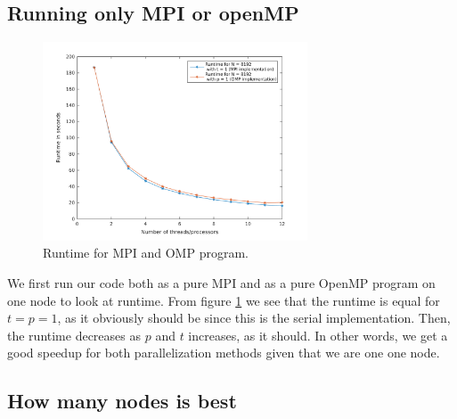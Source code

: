 \subsection*{Running only MPI or openMP}
\begin{figure}[h!]
			\centering
			\includegraphics[width=0.7\textwidth]{./figures/runtime_either_MPI_OMP}
			\caption{Runtime for MPI and OMP program.}
			\label{fig:MPIvsOMP}
\end{figure}
We first run our code both as a pure MPI and as a pure OpenMP program on one node to look at runtime. From figure \ref{fig:MPIvsOMP} we see that the runtime is equal for $t = p = 1$, as it obviously should be since this is the serial implementation. Then, the runtime decreases as $p$ and $t$ increases, as it should. In other words, we get a good speedup for both parallelization methods given that we are one one node. 
\subsection*{How many nodes is best}


